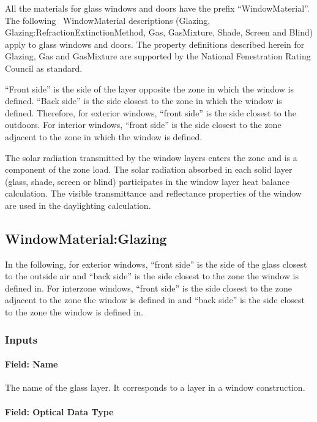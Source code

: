All the materials for glass windows and doors have the prefix ``WindowMaterial''. The following~ WindowMaterial descriptions (Glazing, Glazing:RefractionExtinctionMethod, Gas, GasMixture, Shade, Screen and Blind) apply to glass windows and doors. The property definitions described herein for Glazing, Gas and GasMixture are supported by the National Fenestration Rating Council as standard.

``Front side'' is the side of the layer opposite the zone in which the window is defined. ``Back side'' is the side closest to the zone in which the window is defined. Therefore, for exterior windows, ``front side'' is the side closest to the outdoors. For interior windows, ``front side'' is the side closest to the zone adjacent to the zone in which the window is defined.

The solar radiation transmitted by the window layers enters the zone and is a component of the zone load. The solar radiation absorbed in each solid layer (glass, shade, screen or blind) participates in the window layer heat balance calculation. The visible transmittance and reflectance properties of the window are used in the daylighting calculation.

\subsection{WindowMaterial:Glazing}\label{windowmaterialglazing}

In the following, for exterior windows, ``front side'' is the side of the glass closest to the outside air and ``back side'' is the side closest to the zone the window is defined in. For interzone windows, ``front side'' is the side closest to the zone adjacent to the zone the window is defined in and ``back side'' is the side closest to the zone the window is defined in.

\subsubsection{Inputs}\label{inputs-13-015}

\paragraph{Field: Name}\label{field-name-7-020}

The name of the glass layer. It corresponds to a layer in a window construction.

\paragraph{Field: Optical Data Type}\label{field-optical-data-type}

